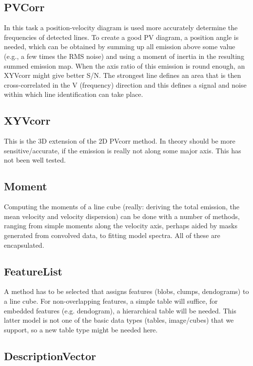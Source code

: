 \documentclass{article}
\begin{document}
\subsection{PVCorr}

In this task a position-velocity diagram is used more accurately
determine the frequencies of detected lines.  To create a good PV
diagram, a position angle is needed, which can be obtained by summing
up all emission above some value (e.g., a few times the RMS noise) and using
a moment of inertia in the resulting summed emission map.  When the axis
ratio of this emission is round enough, an XYVcorr might give better S/N.
The strongest line defines an area that is then cross-correlated in the V
(frequency) direction and this defines a signal and noise within which
line identification can take place.

\subsection{XYVcorr}

This is the 3D extension of the 2D PVcorr method. In theory should be
more sensitive/accurate, if the emission is really not along some
major axis. This has not been well tested.

\subsection{Moment}

Computing the moments of a line cube (really: deriving the total
emission, the mean velocity and velocity dispersion) can be done
with a number of methods, ranging from simple moments along the
velocity axis, perhaps aided by masks generated from convolved
data, to fitting model spectra. All of these are encapsulated.

\subsection{FeatureList}

A method has to be selected that assigns features  (blobs, clumps, 
dendograms) to a line cube.  For non-overlapping features, a simple
table will suffice, for embedded features (e.g. dendogram),
a hierarchical table will be needed. This latter model is not one of
the basic data types (tables, image/cubes) that we support, so a
new table type might be needed here.

\subsection{DescriptionVector}
\end{document}
